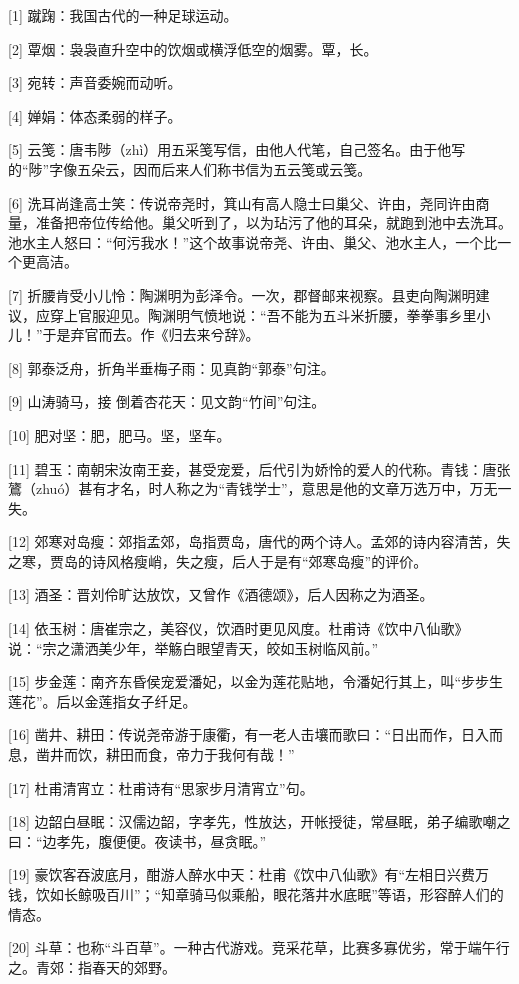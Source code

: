 \documentclass[12pt,UTF8]{ctexbook}
\begin{document}
[1] 蹴踘：我国古代的一种足球运动。

[2] 覃烟：袅袅直升空中的饮烟或横浮低空的烟雾。覃，长。

[3] 宛转：声音委婉而动听。

[4] 婵娟：体态柔弱的样子。

[5] 云笺：唐韦陟（zhì）用五采笺写信，由他人代笔，自己签名。由于他写的“陟”字像五朵云，因而后来人们称书信为五云笺或云笺。

[6] 洗耳尚逢高士笑：传说帝尧时，箕山有高人隐士曰巢父、许由，尧同许由商量，准备把帝位传给他。巢父听到了，以为玷污了他的耳朵，就跑到池中去洗耳。池水主人怒曰：“何污我水！”这个故事说帝尧、许由、巢父、池水主人，一个比一个更高洁。

[7] 折腰肯受小儿怜：陶渊明为彭泽令。一次，郡督邮来视察。县吏向陶渊明建议，应穿上官服迎见。陶渊明气愤地说：“吾不能为五斗米折腰，拳拳事乡里小儿！”于是弃官而去。作《归去来兮辞》。

[8] 郭泰泛舟，折角半垂梅子雨：见真韵“郭泰”句注。

[9] 山涛骑马，接 倒着杏花天：见文韵“竹间”句注。

[10] 肥对坚：肥，肥马。坚，坚车。

[11] 碧玉：南朝宋汝南王妾，甚受宠爱，后代引为娇怜的爱人的代称。青钱：唐张鷟（zhuó）甚有才名，时人称之为“青钱学士”，意思是他的文章万选万中，万无一失。

[12] 郊寒对岛瘦：郊指孟郊，岛指贾岛，唐代的两个诗人。孟郊的诗内容清苦，失之寒，贾岛的诗风格瘦峭，失之瘦，后人于是有“郊寒岛瘦”的评价。

[13] 酒圣：晋刘伶旷达放饮，又曾作《酒德颂》，后人因称之为酒圣。

[14] 依玉树：唐崔宗之，美容仪，饮酒时更见风度。杜甫诗《饮中八仙歌》说：“宗之潇洒美少年，举觞白眼望青天，皎如玉树临风前。”

[15] 步金莲：南齐东昏侯宠爱潘妃，以金为莲花贴地，令潘妃行其上，叫“步步生莲花”。后以金莲指女子纤足。

[16] 凿井、耕田：传说尧帝游于康衢，有一老人击壤而歌曰：“日出而作，日入而息，凿井而饮，耕田而食，帝力于我何有哉！”

[17] 杜甫清宵立：杜甫诗有“思家步月清宵立”句。

[18] 边韶白昼眠：汉儒边韶，字孝先，性放达，开帐授徒，常昼眠，弟子编歌嘲之曰：“边孝先，腹便便。夜读书，昼贪眠。”

[19] 豪饮客吞波底月，酣游人醉水中天：杜甫《饮中八仙歌》有“左相日兴费万钱，饮如长鲸吸百川”；“知章骑马似乘船，眼花落井水底眠”等语，形容醉人们的情态。

[20] 斗草：也称“斗百草”。一种古代游戏。竞采花草，比赛多寡优劣，常于端午行之。青郊：指春天的郊野。
\end{document}
